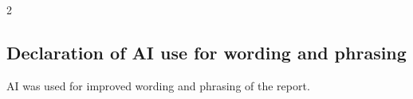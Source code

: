 2\vspace*{\fill} %
\begin{center}
    \section*{Declaration of AI use for wording and phrasing}
    AI was used for improved wording and phrasing of the report.
\end{center}
\vspace*{\fill} %
\newpage
\tableofcontents



